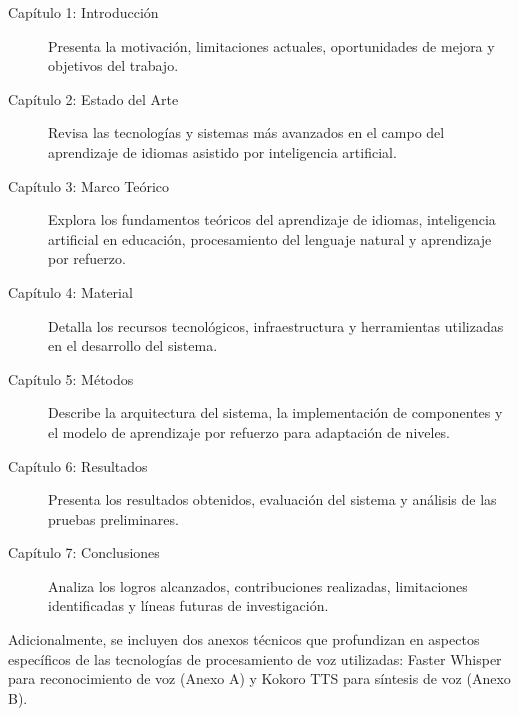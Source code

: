 \begin{description}
  \item[Capítulo 1: Introducción] Presenta la motivación, limitaciones actuales, oportunidades de mejora y objetivos del trabajo.
  
  \item[Capítulo 2: Estado del Arte] Revisa las tecnologías y sistemas más avanzados en el campo del aprendizaje de idiomas asistido por inteligencia artificial.
  
  \item[Capítulo 3: Marco Teórico] Explora los fundamentos teóricos del aprendizaje de idiomas, inteligencia artificial en educación, procesamiento del lenguaje natural y aprendizaje por refuerzo.
  
  \item[Capítulo 4: Material] Detalla los recursos tecnológicos, infraestructura y herramientas utilizadas en el desarrollo del sistema.
  
  \item[Capítulo 5: Métodos] Describe la arquitectura del sistema, la implementación de componentes y el modelo de aprendizaje por refuerzo para adaptación de niveles.
  
  \item[Capítulo 6: Resultados] Presenta los resultados obtenidos, evaluación del sistema y análisis de las pruebas preliminares.
  
  \item[Capítulo 7: Conclusiones] Analiza los logros alcanzados, contribuciones realizadas, limitaciones identificadas y líneas futuras de investigación.
\end{description}

Adicionalmente, se incluyen dos anexos técnicos que profundizan en aspectos específicos de las tecnologías de procesamiento de voz utilizadas: Faster Whisper para reconocimiento de voz (Anexo A) y Kokoro TTS para síntesis de voz (Anexo B).